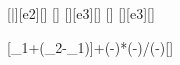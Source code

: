 [\milli\bar][e2][\pascal]
[\degreeCelsius]
[\kilo\pascal][e3][\pascal]
[\degreeCelsius]
[\kilo\pascal][e3][\pascal]

[\vartheta_1+\left(\vartheta_2-\vartheta_1\right)]{\thAX+(\thBX-\thAX)*(\pRX-\psAX)/(\psBX-\psAX)}[\degreeCelsius]
